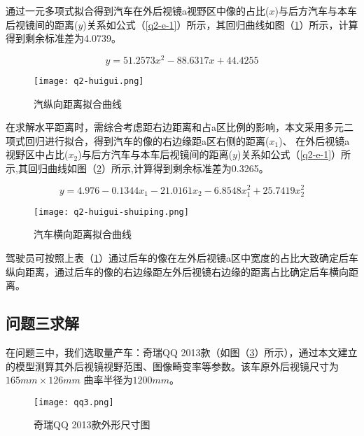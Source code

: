 \documentclass[withoutpreface,bwprint]{cumcmthesis} %
\begin{document}
\par 通过一元多项式拟合得到汽车在外后视镜a视野区中像的占比($x$)与后方汽车与本车后视镜间的距离($y$)关系如公式（\ref{q2-e-1}）所示，其回归曲线如图（\ref{q2-huigui}）所示，计算得到剩余标准差为4.0739。

\begin{equation}
\label{q2-e-1}
	y = 51.2573x^2 - 88.6317x + 44.4255
\end{equation}


\begin{figure}[h]
\small
\centering
\texttt{[image: q2-huigui.png]}
\caption{汽纵向距离拟合曲线} \label{q2-huigui}
\end{figure}



\par 在求解水平距离时，需综合考虑距右边距离和占a区比例的影响，本文采用多元二项式回归进行拟合，得到汽车的像的右边缘距a区右侧的距离($x_1$)、 在外后视镜a视野区中占比($x_2$)与后方汽车与本车后视镜间的距离($y$)关系如公式（\ref{q2-e-1}）所示,其回归曲线如图（\ref{q2-huigui-shuiping}）所示,计算得到剩余标准差为0.3265。

\begin{equation}
	y = 4.976 - 0.1344 x_1 -21.0161 x_2 - 6.8548 x_1^2 + 25.7419 x_2^2
\end{equation}



\begin{figure}[h]
\small
\centering
\texttt{[image: q2-huigui-shuiping.png]}
\caption{汽车横向距离拟合曲线} \label{q2-huigui-shuiping}
\end{figure}


\par 驾驶员可按照上表（\ref{q2-huigui}）通过后车的像在左外后视镜a区中宽度的占比大致确定后车纵向距离，通过后车的像的右边缘距左外后视镜右边缘的距离占比确定后车横向距离。


\subsection{问题三求解}
\par 在问题三中，我们选取量产车：奇瑞QQ 2013款（如图（\ref{fig:qq3}）所示），通过本文建立的模型测算其外后视镜视野范围、图像畸变率等参数。该车原外后视镜尺寸为$165mm \times 126mm$ 曲率半径为$1200mm$。
\begin{figure}[h]
\small
\centering
\texttt{[image: qq3.png]}
\caption{奇瑞QQ 2013款外形尺寸图} \label{fig:qq3}
\end{figure}
\end{document}
